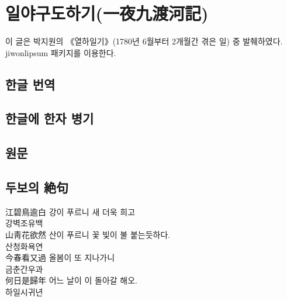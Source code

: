 
\chapter[일야구도하기]{일야구도하기(一夜九渡河記)}

\begin{flushright}
\small\sffamily 이 글은 박지원의 《열하일기》(1780년 6월부터 2개월간 겪은 일) 중 발췌하였다.\\ jiwonlipsum 패키지를 이용한다.
\end{flushright}

\section{한글 번역}
\jiwon[1-12]

\section{한글에 한자 병기}
\jiwon[13-20]

\section{원문}
\jiwon[21-28]

\section{두보의 絶句}
江碧鳥逾白 \quad  강이 푸르니 새 더욱 희고\\
강벽조유백 \\
山靑花欲然 \quad 산이 푸르니 꽃 빛이 불 붙는듯하다.\\
산청화욕연 \\
今春看又過 \quad 올봄이 또 지나가니\\
금춘간우과  \\
何日是歸年 \quad 어느 날이 이 돌아갈 해오.\\
하일시귀년 



